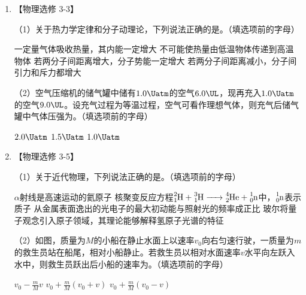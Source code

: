 \documentclass[\gkver]{gaokaozhenti}
\begin{document}
\begin{enumerate}
\item
【物理选修 3-3】

（1）关于热力学定律和分子动理论，下列说法正确的是。（填选项前的字母）

\fourchoices
{一定量气体吸收热量，其内能一定增大}
{不可能使热量由低温物体传递到高温物体}
{若两分子间距离增大，分子势能一定增大}
{若两分子间距离减小，分子间引力和斥力都增大}

（2）空气压缩机的储气罐中储有$1.0\Uatm$的空气$6.0\UL$，现再充入$1.0\Uatm$的空气$9.0\UL$。设充气过程为等温过程，空气可看作理想气体，则充气后储气罐中气体压强为。（填选项前的字母）

\fourchoices[answer=A]
{$2.5\Uatm$}
{$2.0\Uatm$}
{$1.5\Uatm$}
{$1.0\Uatm$}

\item
【物理选修 3-5】

（1）关于近代物理，下列说法正确的是。（填选项前的字母）

\fourchoices
{$\alpha$射线是高速运动的氦原子}
{核聚变反应方程$\ce{^{2}_{1}H + ^{3}_{1}H -> ^{4}_{2}He + ^{1}_{0}n}$中，$\ce{^{1}_{0}n}$表示质子}
{从金属表面逸出的光电子的最大初动能与照射光的频率成正比}
{玻尔将量子观念引入原子领域，其理论能够解释氢原子光谱的特征}

（2）如图，质量为$M$的小船在静止水面上以速率$v_{0}$向右匀速行驶，一质量为$m$的救生员站在船尾，相对小船静止。若救生员以相对水面速率$v$水平向左跃入水中，则救生员跃出后小船的速率为。（填选项前的字母）

{$v_{0}-\frac{m}{M}v$}
{$v_{0}+\frac{m}{M}(v_{0}+v)$}
{$v_{0}+\frac{m}{M}(v_{0}-v)$}

\end{enumerate}
\end{document}
